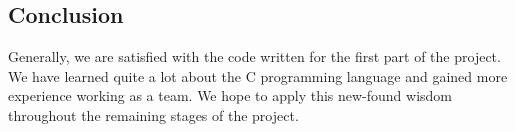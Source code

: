\documentclass[11pt]{article}
\begin{document}
\subsection*{Conclusion}
Generally, we are satisfied with the code written for the first part of the project. We have learned quite a lot about the C programming language and gained more experience working as a team. We hope to apply this new-found wisdom throughout the remaining stages of the project.
\end{document}
